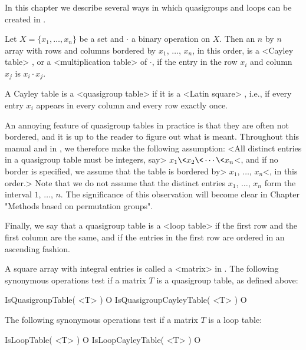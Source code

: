 
In this chapter we describe several ways in which quasigroups and loops can be created in {\LOOPS}.


Let $X=\{x_1,\dots,x_n\}$ be a set and $\cdot$ a binary operation on $X$. Then
an $n$ by $n$ array with rows and columns bordered by $x_1$, $\dots$, $x_n$, in
this order, is a <Cayley table>
%
%
, or a <multiplication table>
%
%
 of
$\cdot$, if the entry in the row $x_i$ and column $x_j$ is $x_i\cdot x_j$.

A Cayley table is a <quasigroup table>
%
%
 if it is a <Latin square>
%
%
,
i.e., if every entry $x_i$ appears in every column and every row exactly once.

An annoying feature of quasigroup tables in practice is that they are often not
bordered, and it is up to the reader to figure out what is meant. Throughout
this manual and in {\LOOPS}, we therefore make the following assumption: <All
distinct entries in a quasigroup table must be integers, say>
$x_1\<x_2\<\cdots\<x_n$<, and if no border is specified, we assume that the
table is bordered by> $x_1$, $\dots$, $x_n$<, in this order.> Note that we do
not assume that the distinct entries $x_1$, $\dots$, $x_n$ form the interval
$1$, $\dots$, $n$. The significance of this observation will become clear in
Chapter "Methods based on permutation groups".

Finally, we say that a quasigroup table is a <loop table>
%
%
 if the first row
and the first column are the same, and if the entries in the first row are
ordered in an ascending fashion.


A square array with integral entries is called a <matrix> in {\GAP}. The
following synonymous operations test if a matrix $T$ is a quasigroup table, as
defined above:

\>IsQuasigroupTable( <T> ) O
\>IsQuasigroupCayleyTable( <T> ) O

The following synonymous operations test if a matrix $T$ is a loop table:

\>IsLoopTable( <T> ) O
\>IsLoopCayleyTable( <T> ) O

